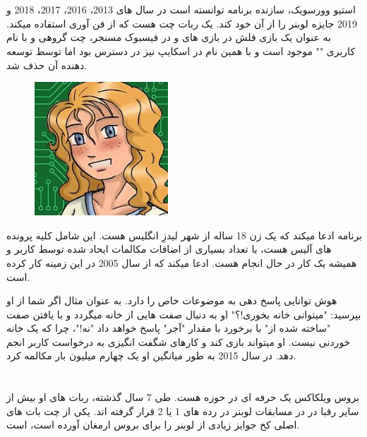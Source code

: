 \documentclass[14pt,a4paper]{report}
\begin{document}
	 \section{}
 	استیو وورسویک، سازنده برنامه  توانسته است در سال های 2013، 2016، 2017، 2018 و 2019 جایزه لوبنر را از آن خود کند.  یک ربات چت هست که از فن آوری  استفاده میکند.   به عنوان یک بازی فلش در بازی های   و در فیسبوک مسنجر، چت گروهی   و  با نام کاربری "" موجود است و با همین نام در اسکایپ نیز در دسترس بود اما توسط توسعه دهنده آن حذف شد.
 	
\begin{figure}
	\begin{center}
		\includegraphics[width=5cm, height=5cm]{imgs/Mitsuku.jpg}
		\label{Mitsuku image}
		\caption{}
	\end{center}
\end{figure} 	
 	
 برنامه 	 ادعا میکند که یک زن 18 ساله از شهر لیدزِ انگلیس هست. این شامل کلیه پرونده های  آلیس هست، با تعداد بسیاری از اضافات مکالمات ایحاد شده توسط کاربر و همیشه یک کار در حال انجام هست.  ادعا میکند که از سال 2005 در این زمینه کار کرده است. 
  
 هوش  توانایی پاسخ دهی به موضوعات خاص را دارد. به عنوان مثال اگر شما از او بپرسید: "میتوانی خانه بخوری!؟" او به دنبال صفت هایی از خانه میگردد و با یافتن صفت "ساخته شده از" با برخورد با مقدار "آجر" پاسخ خواهد داد "نه!"، چرا که یک خانه خوردنی نیست. او میتواند بازی کند و کارهای شگفت انگیزی به درخواست کاربر انجم دهد. در سال 2015 به طور میانگین او یک چهارم میلیون بار مکالمه کرد. 
 



 
 \section{}
 بروس ویلکاکس یک حرفه ای در حوزه  هست. طی 7 سال گذشته، ربات های او بیش از سایر رقبا در در مسابقات لوبنر در رده های 1 یا 2 قرار گرفته اند. یکی از چت بات های اصلی کخ جوایز زیادی از لوبنر را برای بروس ارمغان آورده است،  است.
 
\end{document}

